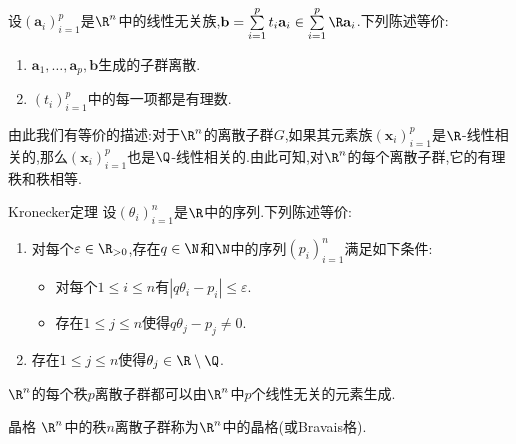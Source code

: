 \begin{corollary}{}{}
	设$\left(\mathbf{a}_{i}\right)_{i=1}^{p}$是$\R^{n}$中的线性无关族,$\mathbf{b}=\sum\limits_{i=1}^{p}t_{i}\mathbf{a}_{i}\in\sum\limits_{i=1}^{p}\R\mathbf{a}_{i}$.下列陈述等价:
	\begin{enumerate}
		\item $\mathbf{a}_{1},\ldots,\mathbf{a}_{p},\mathbf{b}$生成的子群离散.
		\item $\left(t_{i}\right)_{i=1}^{p}$中的每一项都是有理数.
	\end{enumerate}
\end{corollary}

\begin{remark}{}{}
	由此我们有等价的描述:对于$\R^{n}$的离散子群$G$,如果其元素族$\left(\mathbf{x}_{i}\right)_{i=1}^{p}$是$\R$-线性相关的,那么$\left(\mathbf{x}_{i}\right)_{i=1}^{p}$也是$\Q$-线性相关的.由此可知,对$\R^{n}$的每个离散子群,它的有理秩和秩相等.
\end{remark}

\begin{proposition}{Kronecker定理}{}
	设$\left(\theta_{i}\right)_{i=1}^{n}$是$\R$中的序列.下列陈述等价:
	\begin{enumerate}
		\item 对每个$\varepsilon\in\R_{>0}$,存在$q\in\N$和$\N$中的序列$\left(p_{i}\right)_{i=1}^{n}$满足如下条件:
		\begin{itemize}
			\item 对每个$1\leq i\leq n$有$\left|q\theta_{i}-p_{i}\right|\leq\varepsilon$.
			\item 存在$1\leq j\leq n$使得$q\theta_{j}-p_{j}\neq 0$.
		\end{itemize}
		\item 存在$1\leq j\leq n$使得$\theta_{j}\in\R\setminus\Q$.
	\end{enumerate}
\end{proposition}

\begin{theorem}{}{}
	$\R^{n}$的每个秩$p$离散子群都可以由$\R^{n}$中$p$个线性无关的元素生成.
\end{theorem}

\begin{definition}{晶格}{}
	$\R^{n}$中的秩$n$离散子群称为$\R^{n}$中的晶格(或Bravais格).
\end{definition}